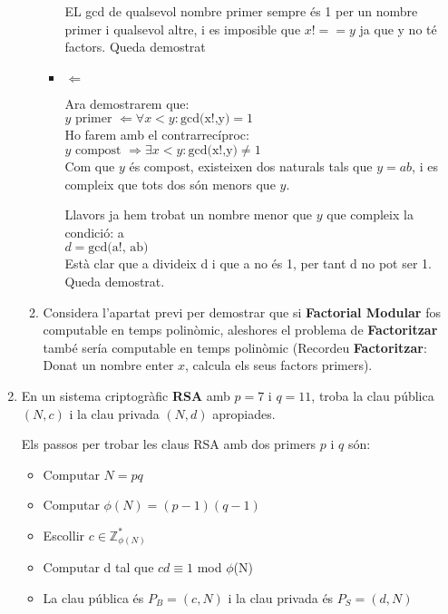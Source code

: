\documentclass[a4paper,10pt]{article}
\begin{document}
\begin{enumerate}
\begin{enumerate}
\begin{itemize}
   EL gcd de qualsevol nombre primer sempre és 1 per un nombre primer i qualsevol altre, i es imposible que $x! == y$ ja que y no té factors. Queda demostrat
   
   \item $\Leftarrow$
   
   Ara demostrarem que: \\
   $y \textrm{ primer } \Leftarrow \forall x < y : \textrm{gcd(x!,y)} = 1$ \\
   
   Ho farem amb el contrarrecíproc: \\
   $ y \textrm{ compost } \Rightarrow \exists x < y : \textrm{gcd(x!,y)} \neq 1$ \\
   Com que $y$ és compost, existeixen dos naturals tals que $y = ab$, i es compleix que tots dos són menors que $y$.
   
   Llavors ja hem trobat un nombre menor que $y$ que compleix la condició: a \\
   $d = \textrm{gcd(a!, ab)}$ \\
   Està clar que a divideix d i que a no és 1, per tant d no pot ser 1. Queda demostrat.
   
  \end{itemize}


  
  \item Considera l'apartat previ per demostrar que si \textbf{Factorial Modular} fos computable en temps polinòmic, aleshores el problema de \textbf{Factoritzar} també sería computable en temps polinòmic (Recordeu \textbf{Factoritzar}: Donat un nombre enter $x$, calcula els seus factors primers).
 \end{enumerate}

 \item En un sistema criptogràfic \textbf{RSA} amb $p = 7$ i $q = 11$, troba la clau pública $(N,c)$ i la clau privada $(N,d)$ apropiades.

 Els passos per trobar les claus RSA amb dos primers $p$ i $q$ són:
 \begin{itemize}
  \item Computar $N = pq$
  \item Computar $\phi(N) = (p - 1)(q - 1)$
  \item Escollir $c \in \mathds{Z}_{\phi(N)}^*$
  \item Computar d tal que $cd \equiv 1 $ mod $\phi$(N)
  \item La clau pública és $P_B = (c,N)$ i la clau privada és $P_S = (d,N)$
 \end{itemize}
 

\end{enumerate}
\end{document}
